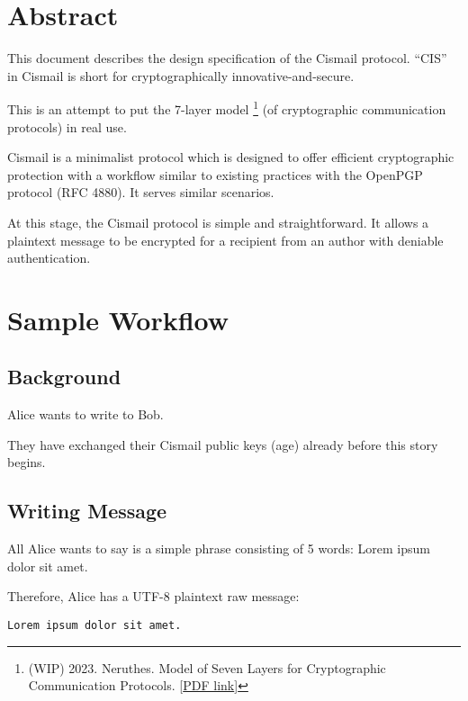 \documentclass[a4paper,11pt]{article}
\begin{document}

\fulldoctitle


\section*{Abstract}

This document describes the design specification of the Cismail protocol.
``CIS'' in Cismail is short for cryptographically innovative-and-secure.

This is an attempt to put the 7-layer model%
\footnote{(WIP) 2023. Neruthes. Model of Seven Layers for Cryptographic Communication Protocols. [\href{https://pub-714f8d634e8f451d9f2fe91a4debfa23.r2.dev/keep/ntexdb/note-20230206-crypt-suite.pdf--6c7cbbc319948e0dd9e2ae6b5fcdfa27.pdf}{PDF link}]}
(of cryptographic communication protocols) in real use.

Cismail is a minimalist protocol which is designed to offer efficient cryptographic protection
with a workflow similar to existing practices with the OpenPGP protocol (RFC 4880).
It serves similar scenarios.

At this stage, the Cismail protocol is simple and straightforward.
It allows a plaintext message to be encrypted for a recipient from an author with deniable authentication.




\section{Sample Workflow}

\subsection{Background}

Alice wants to write to Bob.

They have exchanged their Cismail public keys (age) already before this story begins.

\subsection{Writing Message}

All Alice wants to say is a simple phrase consisting of 5 words: Lorem ipsum dolor sit amet.

Therefore, Alice has a UTF-8 plaintext raw message:

\begin{lstlisting}
Lorem ipsum dolor sit amet.
\end{lstlisting}
\end{document}
